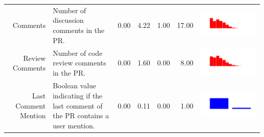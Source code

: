 \begin{table}[ht]
\begin{tabular}{rp{20em}rrrrc}
    Comments & Number of discussion comments in the PR. & 0.00 & 4.22 & 1.00 & 17.00 & \includegraphics[scale = 0.1, clip = true, trim= 50px 60px 50px 60px]{../figs/hist-features/hist-comments.pdf} \\
    Review Comments & Number of code review comments in the PR. & 0.00 & 1.60 & 0.00 & 8.00 & \includegraphics[scale = 0.1, clip = true, trim= 50px 60px 50px 60px]{../figs/hist-features/hist-reviewComments.pdf} \\
    Last Comment Mention & Boolean value indicating if the last comment of the PR contains a user mention. & 0.00 & 0.11 & 0.00 & 1.00 & \includegraphics[scale = 0.1, clip = true, trim= 50px 60px 50px 60px]{../figs/hist-features/hist-lastCommentMention.pdf} \\

\end{tabular}
\end{table}
